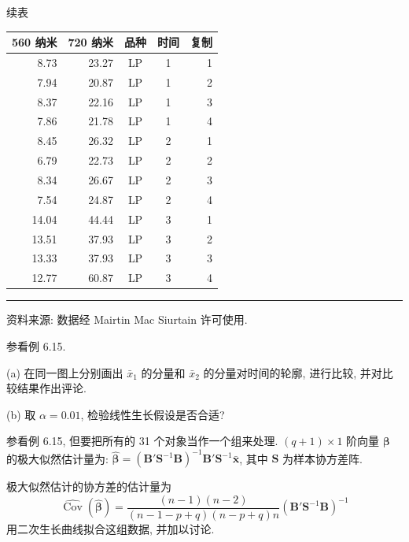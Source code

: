
\begin{center}
\small 续表
\end{center}

\begin{mvtable}
\begin{tabular}{rrccr}
\toprule
560 纳米 & 720 纳米 & 品种 & 时间 & 复制\\\midrule
8.73 & 23.27 & LP & 1 & 1\\
7.94 & 20.87 & LP & 1 & 2\\
8.37 & 22.16 & LP & 1 & 3\\
7.86 & 21.78 & LP & 1 & 4\\
8.45 & 26.32 & LP & 2 & 1\\
6.79 & 22.73 & LP & 2 & 2\\
8.34 & 26.67 & LP & 2 & 3\\
7.54 & 24.87 & LP & 2 & 4\\
14.04 & 44.44 & LP & 3 & 1\\
13.51 & 37.93 & LP & 3 & 2\\
13.33 & 37.93 & LP & 3 & 3\\
12.77 & 60.87 & LP & 3 & 4\\
\bottomrule
\end{tabular}
\end{mvtable}

\vspace{2pt}
\noindent\rule{\linewidth}{0.4pt}

\noindent\small 资料来源: 数据经 Mairtin Mac Siurtain 许可使用.

\vspace{1em}
\quad 参看例 6.15.

\noindent (a) 在同一图上分别画出 $\bar{x}_1$ 的分量和 $\bar{x}_2$ 的分量对时间的轮廓, 进行比较, 并对比较结果作出评论.

\noindent (b) 取 $\alpha=0.01$, 检验线性生长假设是否合适?

\quad 参看例 6.15, 但要把所有的 31 个对象当作一个组来处理. $(q+1)\times 1$ 阶向量 $\boldsymbol{\beta}$ 的极大似然估计量为: $\hat{\boldsymbol{\beta}}=(\mathbf{B}'\mathbf{S}^{-1}\mathbf{B})^{-1}\mathbf{B}'\mathbf{S}^{-1}\bar{\mathbf{x}}$, 其中 $\mathbf{S}$ 为样本协方差阵.

\noindent 极大似然估计的协方差的估计量为
\[
\widehat{\operatorname{Cov}}(\hat{\boldsymbol{\beta}})=\frac{(n-1)(n-2)}{(n-1-p+q)(n-p+q)n}(\mathbf{B}'\mathbf{S}^{-1}\mathbf{B})^{-1}
\]
用二次生长曲线拟合这组数据, 并加以讨论.

